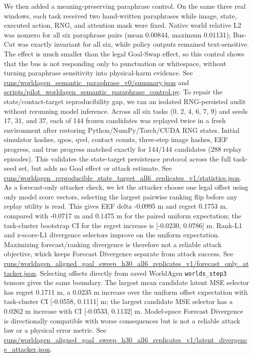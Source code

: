 \documentclass[10pt]{article}
\begin{document}
We then added a meaning-preserving paraphrase control. On the same three real windows, each task received two hand-written paraphrases while image, state, executed action, RNG, and attention mask were fixed. Native world relative L2 was nonzero for all six paraphrase pairs (mean 0.00844, maximum 0.01131); Bus-Cut was exactly invariant for all six, while policy outputs remained text-sensitive. The effect is much smaller than the legal Goal-Swap effect, so this control shows that the bus is not responding only to punctuation or whitespace, without turning paraphrase sensitivity into physical-harm evidence. See \url{runs/worldagen_semantic_paraphrase_v0/summary.json} and \url{scripts/pilot_worldagen_semantic_paraphrase_control.py}.
To repair the state/contact-target reproducibility gap, we ran an isolated RNG-persisted audit without rerunning model inference. Across all six tasks (0, 2, 4, 6, 7, 9) and seeds 17, 31, and 37, each of 144 frozen candidates was replayed twice in a fresh environment after restoring Python/NumPy/Torch/CUDA RNG states. Initial simulator hashes, qpos, qvel, contact counts, three-step image hashes, EEF progress, and true progress matched exactly for 144/144 candidates (288 replay episodes). This validates the state-target persistence protocol across the full task-seed set, but adds no Goal effect or attack estimate. See \url{runs/worldagen_reproducible_state_target_all6_replicates_v1/statistics.json}.
As a forecast-only attacker check, we let the attacker choose one legal offset using only model score vectors, selecting the largest pairwise ranking flip before any replay utility is read. This gives EEF delta -0.0995 m and regret 0.1753 m, compared with -0.0717 m and 0.1475 m for the paired uniform expectation; the task-cluster bootstrap CI for the regret increase is [-0.0230, 0.0786] m. Rank-L1 and z-score-L1 divergence selectors improve on the uniform expectation. Maximizing forecast/ranking divergence is therefore not a reliable attack objective, which keeps Forecast Divergence separate from attack success. See \url{runs/worldagen_aligned_goal_sweep_h30_all6_replicates_v1/forecast_only_attacker.json}.
Selecting offsets directly from saved WorldAgen \texttt{worlds\_step3} tensors gives the same boundary. The largest mean candidate latent MSE selector has regret 0.1711 m, a 0.0235 m increase over the uniform offset expectation with task-cluster CI [-0.0558, 0.1111] m; the largest candidate MSE selector has a 0.0262 m increase with CI [-0.0533, 0.1132] m. Model-space Forecast Divergence is directionally compatible with worse consequences but is not a reliable attack law or a physical error metric. See \url{runs/worldagen_aligned_goal_sweep_h30_all6_replicates_v1/latent_divergence_attacker.json}.
\end{document}
